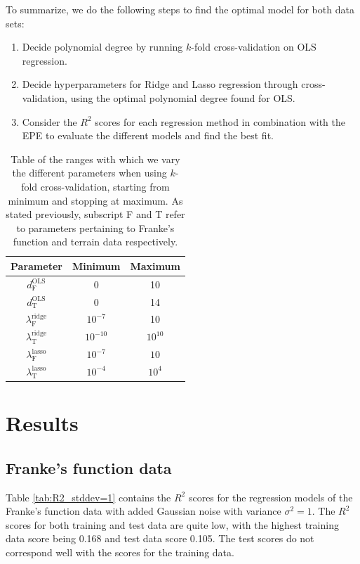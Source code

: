\documentclass[a4paper, 10pt]{article}
\begin{document}
\begin{multicols}{2}
To summarize, we do the following steps to find the optimal model for both data sets:
\begin{enumerate}
\item Decide polynomial degree by running $k$-fold cross-validation on OLS regression.
\item Decide hyperparameters for Ridge and Lasso regression through cross-validation, using the optimal polynomial degree found for OLS.
\item Consider the $R^2$ scores for each regression method in combination with the EPE to evaluate the different models and find the best fit. 
\end{enumerate}

\begin{table}[H]
\caption{Table of the ranges with which we vary the different parameters when using $k$-fold cross-validation, starting from minimum and stopping at maximum. As stated previously, subscript F and T refer  to parameters pertaining to Franke's function and terrain data respectively.}
\label{tab:parameters_kfold}
\centering
{\setlength{\extrarowheight}{4pt}
\begin{tabular}{| c | c | c |} \hline
Parameter & Minimum & Maximum  \\ \hline
$d_\text{F}^\text{OLS}$ & 0 & 10 \\ \hline 
$d_\text{T}^\text{OLS}$ & 0 & 14 \\ \hline 
$\lambda^\text{ridge}_\text{F}$  & $10^{-7}$ & 10\\ \hline 
$\lambda^\text{ridge}_\text{T}$ & $10^{-10}$ & $10^{10}$\\ \hline 
$\lambda^\text{lasso}_\text{F}$  & $10^{-7}$ & $10$\\ \hline 
$\lambda^\text{lasso}_\text{T}$ & $10^{-4}$ & $10^{4}$\\ \hline 
\end{tabular}}
\end{table}





\section{Results}
\subsection{Franke's function data}
Table \ref{tab:R2_stddev=1} contains the $R^2$ scores for the regression models of the Franke's function data with added Gaussian noise with variance $\sigma^2 = 1$. The $R^2$ scores for both training and test data are quite low, with the highest training data score being 0.168 and test data score 0.105. The test scores do not correspond well with the scores for the training data.


\end{multicols}
\end{document}
